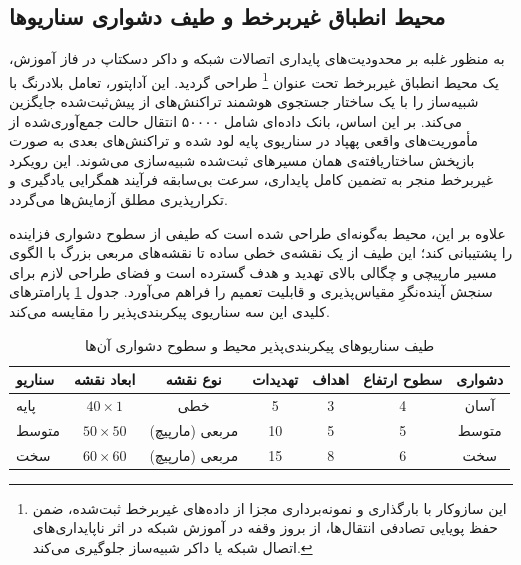 \documentclass[oneside,openany,phd]{TMU-Thesis}
\begin{document}
\subsection{محیط انطباق غیربرخط و طیف دشواری سناریوها}
\label{subsec:dartsim_scenarios}

به منظور غلبه بر محدودیت‌های پایداری اتصالات شبکه و داکر دسکتاپ در فاز آموزش، یک محیط انطباق غیربرخط تحت عنوان \footnote{این سازوکار با بارگذاری و نمونه‌برداری مجزا از داده‌های غیربرخط ثبت‌شده، ضمن حفظ پویایی تصادفی انتقال‌ها، از بروز وقفه در آموزش شبکه در اثر ناپایداری‌های اتصال شبکه یا داکر شبیه‌ساز جلوگیری می‌کند.} طراحی گردید. این آداپتور، تعامل بلادرنگ با شبیه‌ساز را با یک ساختار جستجوی هوشمند تراکنش‌های از پیش‌ثبت‌شده جایگزین می‌کند. بر این اساس، بانک داده‌ای شامل ۵۰۰۰۰ انتقال حالت جمع‌آوری‌شده از مأموریت‌های واقعی پهپاد در سناریوی پایه لود شده و تراکنش‌های بعدی به صورت بازپخش ساختاریافته‌ی همان مسیرهای ثبت‌شده شبیه‌سازی می‌شوند. این رویکرد غیربرخط منجر به تضمین کامل پایداری، سرعت بی‌سابقه فرآیند همگرایی یادگیری و تکرارپذیری مطلق آزمایش‌ها می‌گردد.

علاوه بر این، محیط  به‌گونه‌ای طراحی شده است که طیفی از سطوح دشواری فزاینده را پشتیبانی کند؛ این طیف از یک نقشه‌ی خطی ساده تا نقشه‌های مربعی بزرگ با الگوی مسیر مارپیچی و چگالی بالای تهدید و هدف گسترده است و فضای طراحی لازم برای سنجش آینده‌نگرِ مقیاس‌پذیری و قابلیت تعمیم را فراهم می‌آورد. جدول \ref{tab:dartsim_scenarios} پارامترهای کلیدی این سه سناریوی پیکربندی‌پذیر را مقایسه می‌کند.

\begin{table}[h!]
\centering
\caption{طیف سناریوهای پیکربندی‌پذیر محیط  و سطوح دشواری آن‌ها}
\label{tab:dartsim_scenarios}
\begin{tabular}{|l|c|c|c|c|c|c|}
\hline
\textbf{سناریو} & \textbf{ابعاد نقشه} & \textbf{نوع نقشه} & \textbf{تهدیدات} & \textbf{اهداف} & \textbf{سطوح ارتفاع} & \textbf{دشواری} \\ \hline
پایه & $40 \times 1$ & خطی & 5 & 3 & 4 & آسان \\ \hline
متوسط & $50 \times 50$ & مربعی (مارپیچ) & 10 & 5 & 5 & متوسط \\ \hline
سخت & $60 \times 60$ & مربعی (مارپیچ) & 15 & 8 & 6 & سخت \\ \hline
\end{tabular}
\end{table}
\end{document}
